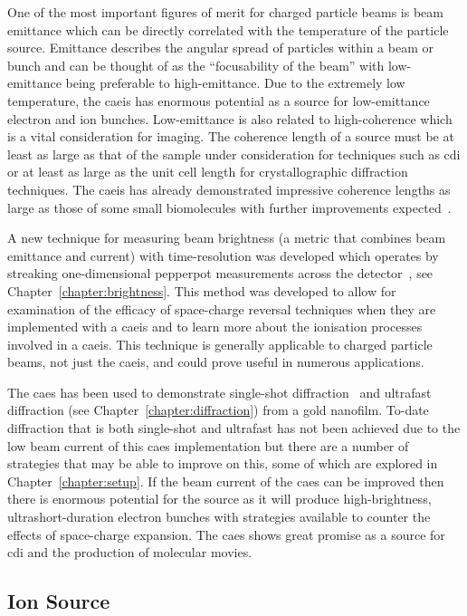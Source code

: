 One of the most important figures of merit for charged particle beams is beam emittance which can be directly correlated with the temperature of the particle source.
Emittance describes the angular spread of particles within a beam or bunch and can be thought of as the ``focusability of the beam'' with low-emittance being preferable to high-emittance.
Due to the extremely low temperature, the \gls{caeis} has enormous potential as a source for low-emittance electron and ion bunches.
Low-emittance is also related to high-coherence which is a vital consideration for imaging.
The coherence length of a source must be at least as large as that of the sample under consideration for techniques such as \gls{cdi} or at least as large as the unit cell length for crystallographic diffraction techniques.
The \gls{caeis} has already demonstrated impressive coherence lengths as large as those of some small biomolecules with further improvements expected~\cite{saliba_spatial_2012}.

A new technique for measuring beam brightness (a metric that combines beam emittance and current) with time-resolution was developed which operates by streaking one-dimensional pepperpot measurements across the detector~\cite{torrance_time-resolved_2018}, see Chapter~\ref{chapter:brightness}.
This method was developed to allow for examination of the efficacy of space-charge reversal techniques when they are implemented with a \gls{caeis} and to learn more about the ionisation processes involved in a \gls{caeis}.
This technique is generally applicable to charged particle beams, not just the \gls{caeis}, and could prove useful in numerous applications.

The \gls{caes} has been used to demonstrate single-shot diffraction~\cite{speirs_single-shot_2015} and ultrafast diffraction (see Chapter~\ref{chapter:diffraction}) from a gold nanofilm.
To-date diffraction that is both single-shot and ultrafast has not been achieved due to the low beam current of this \gls{caes} implementation but there are a number of strategies that may be able to improve on this, some of which are explored in Chapter~\ref{chapter:setup}.
If the beam current of the \gls{caes} can be improved then there is enormous potential for the source as it will produce high-brightness, ultrashort-duration electron bunches with strategies available to counter the effects of space-charge expansion.
The \gls{caes} shows great promise as a source for \gls{cdi} and the production of molecular movies.

\subsection{Ion Source}

